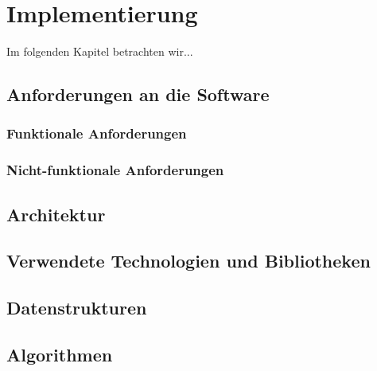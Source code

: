 %
\chapter{Implementierung}
Im folgenden Kapitel betrachten wir...

\section{Anforderungen an die Software}
\subsection{Funktionale Anforderungen}

\subsection{Nicht-funktionale Anforderungen}

\section{Architektur}

\section{Verwendete Technologien und Bibliotheken}

\section{Datenstrukturen}

\section{Algorithmen}
